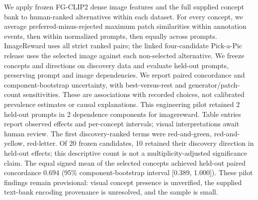 We apply frozen FG-CLIP2 dense image features and the full supplied concept bank to human-ranked alternatives within each dataset. For every concept, we average preferred-minus-rejected maximum patch similarities within annotation events, then within normalized prompts, then equally across prompts. ImageReward uses all strict ranked pairs; the linked four-candidate Pick-a-Pic release uses the selected image against each non-selected alternative. We freeze concepts and directions on discovery data and evaluate held-out prompts, preserving prompt and image dependencies. We report paired concordance and component-bootstrap uncertainty, with best-versus-rest and generator/patch-count sensitivities. These are associations with recorded choices, not calibrated prevalence estimates or causal explanations. This engineering pilot retained 2 held-out prompts in 2 dependence components for imagereward. Table entries report observed effects and per-concept intervals; visual interpretations await human review.
The first discovery-ranked terms were red-and-green, red-and-yellow, red-letter. Of 20 frozen candidates, 10 retained their discovery direction in held-out effects; this descriptive count is not a multiplicity-adjusted significance claim. The equal signed mean of the selected concepts achieved held-out paired concordance 0.694 (95\% component-bootstrap interval [0.389, 1.000]). These pilot findings remain provisional: visual concept presence is unverified, the supplied text-bank encoding provenance is unresolved, and the sample is small.
